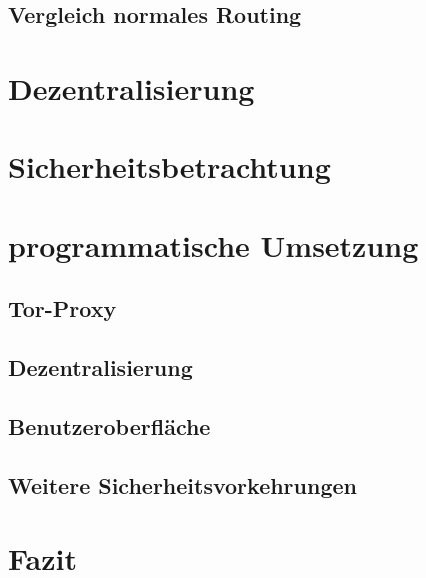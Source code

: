 \documentclass[a4paper,ngerman, headheight=28pt,12pt]{scrartcl}
\begin{document}
\subsection{Vergleich normales Routing}

\section{Dezentralisierung}

\section{Sicherheitsbetrachtung}

\section{programmatische Umsetzung}
\subsection{Tor-Proxy}
\subsection{Dezentralisierung}
\subsection{Benutzeroberfläche}
\subsection{Weitere Sicherheitsvorkehrungen}

\section{Fazit}

\nolinenumbers
\printbibliography %
\end{document}
